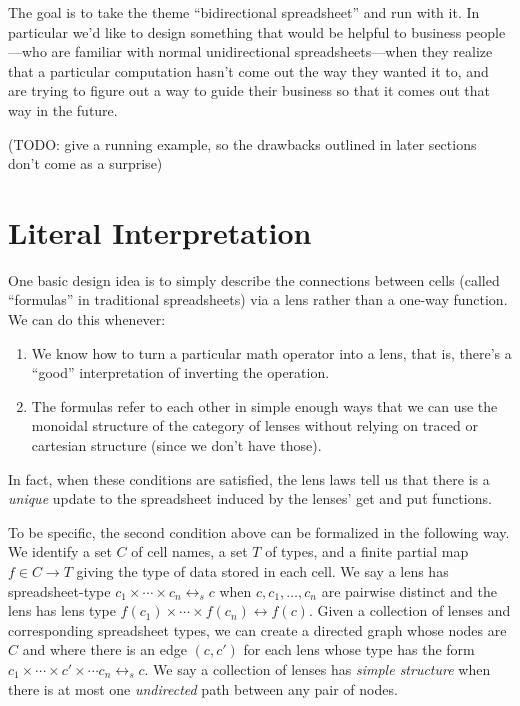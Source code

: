 \documentclass{article}
\newcommand{\lens}{\leftrightarrow}
\newcommand{\slens}{\lens_s}
\begin{document}
The goal is to take the theme ``bidirectional spreadsheet'' and run with it.
In particular we'd like to design something that would be helpful to
business people---who are familiar with normal unidirectional
spreadsheets---when they realize that a particular computation hasn't come
out the way they wanted it to, and are trying to figure out a way to guide
their business so that it comes out that way in the future.

(TODO: give a running example, so the drawbacks outlined in later sections
don't come as a surprise)

\section{Literal Interpretation}
One basic design idea is to simply describe the connections between cells
(called ``formulas'' in traditional spreadsheets) via a lens rather than a
one-way function. We can do this whenever:

\begin{enumerate}
    \item We know how to turn a particular math operator into a lens, that
        is, there's a ``good'' interpretation of inverting the operation.
    \item The formulas refer to each other in simple enough ways that we
        can use the monoidal structure of the category of lenses without
        relying on traced or cartesian structure (since we don't have
        those).
\end{enumerate}

In fact, when these conditions are satisfied, the lens laws tell us that
there is a \emph{unique} update to the spreadsheet induced by the lenses'
get and put functions.

To be specific, the second condition above can be formalized in the
following way. We identify a set $C$ of cell names, a set $T$ of types, and
a finite partial map $f \in C \to T$ giving the type of data stored in each
cell. We say a lens has spreadsheet-type $c_1 \times \cdots \times c_n
\slens c$ when $c, c_1, \ldots, c_n$ are pairwise distinct and the lens has
lens type $f(c_1) \times \cdots \times f(c_n) \lens f(c)$. Given a
collection of lenses and corresponding spreadsheet types, we can create a
directed graph whose nodes are $C$ and where there is an edge $(c,c')$ for
each lens whose type has the form $c_1 \times \cdots \times c' \times \cdots
c_n \slens c$. We say a collection of lenses has \emph{simple structure}
when there is at most one \emph{undirected} path between any pair of nodes.
\end{document}
